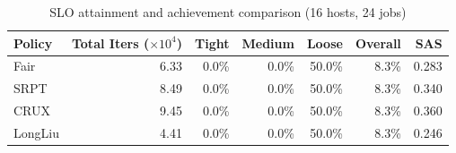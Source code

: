 \begin{table}[t]
\centering
\caption{SLO attainment and achievement comparison (16 hosts, 24 jobs)}
\label{tab:slo_16host}
\begin{tabular}{l|r|r|r|r|r|r}
\hline
Policy & Total Iters ($\times 10^4$) & Tight & Medium & Loose & Overall & SAS \\
\hline
Fair & 6.33 & 0.0\% & 0.0\% & 50.0\% & 8.3\% & 0.283 \\
SRPT & 8.49 & 0.0\% & 0.0\% & 50.0\% & 8.3\% & 0.340 \\
CRUX & 9.45 & 0.0\% & 0.0\% & 50.0\% & 8.3\% & 0.360 \\
LongLiu & 4.41 & 0.0\% & 0.0\% & 50.0\% & 8.3\% & 0.246 \\
\hline
\end{tabular}
\end{table}
